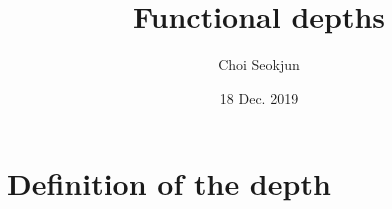 \documentclass[aspectratio=169,ignorenonframetext,9pt]{beamer}
\title{Functional depths}
\author{Choi Seokjun}
\date{18 Dec. 2019}
\theoremstyle{plain}
\theoremstyle{definition}
\begin{document}
\begin{frame}
\maketitle
\end{frame}





\tableofcontents



\section{Definition of the depth}
\end{document}
